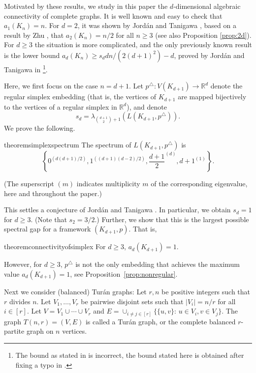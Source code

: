\documentclass[a4paper,11pt]{article}
\theoremstyle{plain}
\theoremstyle{definition}
\newcommand{\Rea}{{\mathbb R}}
\begin{document}
Motivated by these results, we study in this paper the $d$-dimensional algebraic connectivity of complete graphs. It is well known and easy to check that $a_1(K_n)=n$.
For $d=2$, it was shown by Jord\'an and Tanigawa \cite[Theorem 4.4]{jordan2020rigidity}, based on a result by Zhu \cite{zhu2013quantitative}, that $a_2(K_n)=n/2$ for all $n\geq 3$ (see also Proposition \ref{prop:2d}). For $d\geq 3$ the situation is more complicated, and the only previously known result is the lower bound $a_d(K_n)\geq s_d d n/ (2 (d+1)^2)-d$, proved by Jord\'an and Tanigawa in \cite[Thm. 5.2]{jordan2020rigidity}\footnote{The bound as stated in \cite{jordan2020rigidity} is incorrect, the bound stated here is obtained after fixing a typo in \cite[Lemma 5.4]{jordan2020rigidity}.}.

Here, we first focus on the case $n=d+1$. Let $p^{\triangle}:V(K_{d+1})\to \Rea^d$ denote the regular simplex embedding (that is, the vertices of $K_{d+1}$ are mapped bijectively to the vertices of a regular simplex in $\Rea^d$), and denote 
\[s_d=\lambda_{\binom{d+1}{2}+1}(L(K_{d+1},p^{\triangle})).
\]
We prove the following.


\begin{restatable}{theorem}{simplexspectrum}\label{thm:simplex_spectrum}
The spectrum of $L(K_{d+1},p^{\triangle})$ is
\[
    \left\{0^{(d(d+1)/2)},1^{((d+1)(d-2)/2)},\frac{d+1}{2}^{(d)},d+1^{(1)}\right\}.
\]
\end{restatable}
(The superscript $(m)$ indicates multiplicity $m$ of the corresponding eigenvalue, here and throughout the paper.)

This settles a conjecture of Jord\'an and Tanigawa \cite[Conj. 1]{jordan2020rigidity}. In particular, we obtain $s_d=1$ for $d\ge 3$. (Note that $s_2=3/2$.)
Further, we show that this is the largest possible spectral gap for a framework $(K_{d+1},p)$. That is, 
\begin{restatable}{theorem}{connectivityofsimplex}
\label{thm:simplex}
    For $d\geq 3$, $a_d(K_{d+1})=1$.
\end{restatable}
However, for $d\ge 3$, $p^{\triangle}$ is not the only embedding that achieves the maximum value $a_d(K_{d+1})=1$, see Proposition~\ref{prop:nonregular}.


 
Next we consider (balanced) Tur{\'a}n graphs:
Let $r,n$ be positive integers such that $r$ divides $n$.
Let $V_1,\ldots,V_r$ be pairwise disjoint sets such that $|V_i|=n/r$ for all $i\in[r]$. Let $V=V_1\cup\cdots\cup V_r$ and
$E=\cup_{i\neq j\in[r]} \{\{u,v\}:\, u\in V_i, v\in V_j\}$. The graph $T(n,r)=(V,E)$ is called
a Tur{\'a}n graph, or the complete balanced $r$-partite graph on $n$ vertices.
\end{document}
